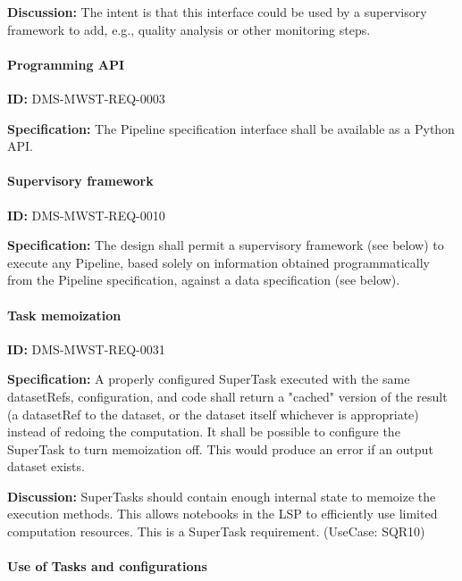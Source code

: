 \documentclass[SE,toc,lsstdraft]{lsstdoc}
\begin{document}
\textbf{Discussion:}
The intent is that this interface could be used by a supervisory framework to add, e.g., quality analysis or other monitoring steps.

\paragraph{Programming API}\hfill  %

\label{DMS-MWST-REQ-0003}
\textbf{ID:} DMS-MWST-REQ-0003

\textbf{Specification:}
The Pipeline specification interface shall be available as a Python API.

\paragraph{Supervisory framework}\hfill  %

\label{DMS-MWST-REQ-0010}
\textbf{ID:} DMS-MWST-REQ-0010

\textbf{Specification:}
The design shall permit a supervisory framework (see below) to execute any Pipeline, based solely on information obtained programmatically from the Pipeline specification, against a data specification (see below).

\paragraph{Task memoization}\hfill  %

\label{DMS-MWST-REQ-0031}
\textbf{ID:} DMS-MWST-REQ-0031

\textbf{Specification:}
A properly configured SuperTask executed with the same datasetRefs, configuration, and code shall return a "cached" version of the result (a datasetRef to the dataset, or the dataset itself whichever is appropriate) instead of redoing the computation. It shall be possible to configure the SuperTask to turn memoization off. This would produce an error if an output dataset exists.

\textbf{Discussion:}
SuperTasks should contain enough internal state to memoize the execution methods. This allows notebooks in the LSP to efficiently use limited computation resources. This is a SuperTask requirement. (UseCase: SQR10)

\paragraph{Use of Tasks and configurations}\hfill  %
\end{document}
